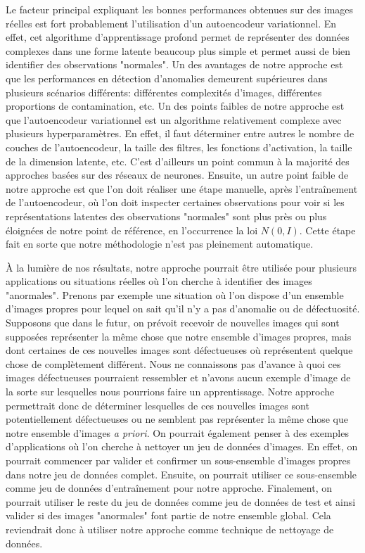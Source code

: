  Le facteur principal expliquant les bonnes performances obtenues sur des images réelles est fort probablement l'utilisation d'un autoencodeur variationnel. En effet, cet algorithme d'apprentissage profond permet de représenter des données complexes dans une forme latente beaucoup plus simple et permet aussi de bien identifier des observations "normales". Un des avantages de notre approche est que les performances en détection d'anomalies demeurent supérieures dans plusieurs scénarios différents: différentes complexités d'images, différentes proportions de contamination, etc. Un des points faibles de notre approche est que l'autoencodeur variationnel est un algorithme relativement complexe avec plusieurs hyperparamètres. En effet, il faut déterminer entre autres le nombre de couches de l'autoencodeur, la taille des filtres, les fonctions d'activation, la taille de la dimension latente, etc. C'est d'ailleurs un point commun à la majorité des approches basées sur des réseaux de neurones. Ensuite, un autre point faible de notre approche est que l'on doit réaliser une étape manuelle, après l'entraînement de l'autoencodeur, où l'on doit inspecter certaines observations pour voir si les représentations latentes des observations "normales" sont plus près ou plus éloignées de notre point de référence, en l'occurrence la loi $N(0,I)$. Cette étape fait en sorte que notre méthodologie n'est pas pleinement automatique.
 
À la lumière de nos résultats, notre approche pourrait être utilisée pour plusieurs applications ou situations réelles où l'on cherche à identifier des images "anormales". Prenons par exemple une situation où l'on dispose d'un ensemble d'images propres pour lequel on sait qu'il n'y a pas d'anomalie ou de défectuosité. Supposons que dans le futur, on prévoit recevoir de nouvelles images qui sont supposées représenter la même chose que notre ensemble d'images propres, mais dont certaines de ces nouvelles images sont défectueuses où représentent quelque chose de complètement différent. Nous ne connaissons pas d'avance à quoi ces images défectueuses pourraient ressembler et n'avons aucun exemple d'image de la sorte sur lesquelles nous pourrions faire un apprentissage. Notre approche permettrait donc de déterminer lesquelles de ces nouvelles images sont potentiellement défectueuses ou ne semblent pas représenter la même chose que notre ensemble d'images \textit{a priori}. On pourrait également penser à des exemples d'applications où l'on cherche à nettoyer un jeu de données d'images. En effet, on pourrait commencer par valider et confirmer un sous-ensemble d'images propres dans notre jeu de données complet. Ensuite, on pourrait utiliser ce sous-ensemble comme jeu de données d'entraînement pour notre approche. Finalement, on pourrait utiliser le reste du jeu de données comme jeu de données de test et ainsi valider si des images "anormales" font partie de notre ensemble global. Cela reviendrait donc à utiliser notre approche comme technique de nettoyage de données.

